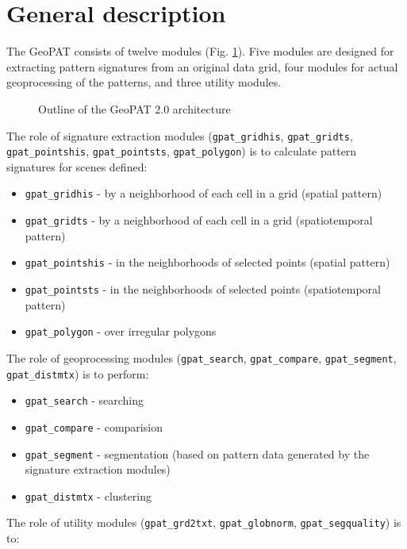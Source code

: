 \section{General description}

The GeoPAT consists of twelve modules (Fig. \ref{FIG:GPAT}).
Five modules are designed for extracting pattern signatures from an original data grid, four modules for actual geoprocessing of the patterns, and three utility modules.

\begin{figure}[H]
 	\centering
	\caption{Outline of the GeoPAT 2.0 architecture}
	\label{FIG:GPAT} 
\end{figure}

The role of signature extraction modules ({\tt gpat\_gridhis}, {\tt gpat\_gridts}, {\tt gpat\_pointshis}, {\tt gpat\_pointsts}, {\tt gpat\_polygon}) is to calculate pattern signatures for scenes defined:

\begin{itemize}
  \item \texttt{gpat\_gridhis} - by a neighborhood of each cell in a grid (spatial pattern)
  \item \texttt{gpat\_gridts} - by a neighborhood of each cell in a grid (spatiotemporal pattern)
  \item \texttt{gpat\_pointshis} - in the neighborhoods of selected points (spatial pattern)
  \item \texttt{gpat\_pointsts} - in the neighborhoods of selected points (spatiotemporal pattern)
  \item \texttt{gpat\_polygon} - over irregular polygons
\end{itemize}

The role of geoprocessing modules ({\tt gpat\_search}, {\tt gpat\_compare}, {\tt gpat\_segment}, {\tt gpat\_distmtx}) is to perform:

\begin{itemize}
  \item \texttt{gpat\_search} - searching
  \item \texttt{gpat\_compare} - comparision
  \item \texttt{gpat\_segment} - segmentation (based on pattern data generated by the signature extraction modules)
  \item \texttt{gpat\_distmtx} - clustering
\end{itemize}

The role of utility modules ({\tt gpat\_grd2txt}, {\tt gpat\_globnorm}, {\tt gpat\_segquality}) is to:

